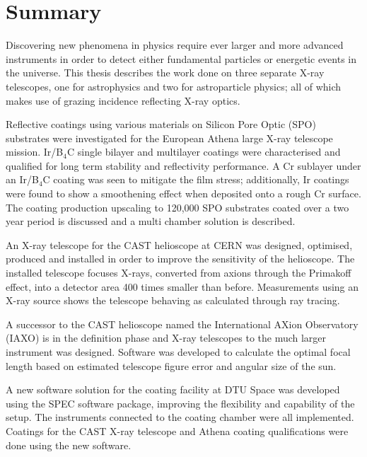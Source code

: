 \chapter{Summary}
Discovering new phenomena in physics require ever larger and more advanced instruments in order to detect either fundamental particles or energetic events in the universe. This thesis describes the work done on three separate X-ray telescopes, one for astrophysics and two for astroparticle physics; all of which makes use of grazing incidence reflecting X-ray optics.

Reflective coatings using various materials on Silicon Pore Optic (SPO) substrates were investigated for the European Athena large X-ray telescope mission. Ir/B$_4$C single bilayer and multilayer coatings were characterised and qualified for long term stability and reflectivity performance. A Cr sublayer under an Ir/B$_4$C coating was seen to mitigate the film stress; additionally, Ir coatings were found to show a smoothening effect when deposited onto a rough Cr surface. The coating production upscaling to 120,000 SPO substrates coated over a two year period is discussed and a multi chamber solution is described.

An X-ray telescope for the CAST helioscope at CERN was designed, optimised, produced and installed in order to improve the sensitivity of the helioscope. The installed telescope focuses X-rays, converted from axions through the Primakoff effect, into a detector area 400 times smaller than before. Measurements using an X-ray source shows the telescope behaving as calculated through ray tracing.

A successor to the CAST helioscope named the International AXion Observatory (IAXO) is in the definition phase and X-ray telescopes to the much larger instrument was designed. Software was developed to calculate the optimal focal length based on estimated telescope figure error and angular size of the sun.

A new software solution for the coating facility at DTU Space was developed using the SPEC software package, improving the flexibility and capability of the setup. The instruments connected to the coating chamber were all implemented. Coatings for the CAST X-ray telescope and Athena coating qualifications were done using the new software.
